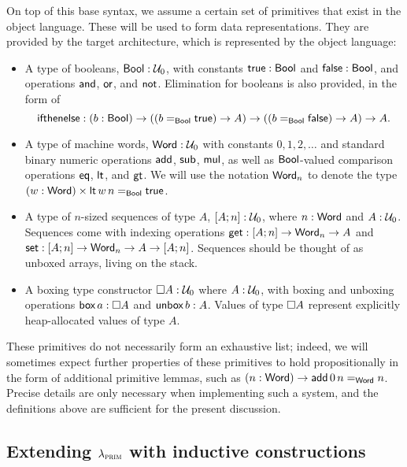 On top of this base syntax, we assume a certain set of primitives that exist in
the object language. These will be used to form data representations. They are
provided by the target architecture, which is represented by the object
language:
\begin{itemize}
  \item A type of booleans, $\inte{Bool} : \univ_0$, with constants $\inte{true} :
          \inte{Bool}$ and $\inte{false} : \inte{Bool}$, and operations $\inte{and}$,
        $\inte{or}$, and $\inte{not}$. Elimination for booleans is also provided, in
        the form of \[\inte{ifthenelse} : (b : \inte{Bool}) \to ((\Id{\inte{Bool}}{b}{\inte{true}}) \to A)
          \to ((\Id{\inte{Bool}}{b}{\inte{false}}) \to A) \to A.\]
  \item A type of machine words, $\inte{Word} : \univ_0$ with constants $0, 1, 2,
          \ldots$ and standard binary numeric operations $\inte{add}$, $\inte{sub}$,
        $\inte{mul}$, as well as $\inte{Bool}$-valued comparison operations
        $\inte{eq}$, $\inte{lt}$, and $\inte{gt}$. We will use the notation
        $\inte{Word}_n$ to denote the type $(w : \inte{Word}) \times
          \Id{\inte{Bool}}{\inte{lt} \, w \, n}{\inte{true}}$.
  \item A type of $n$-sized sequences of type $A$, $\seq{A}{n} : \univ_0$, where $n :
          \inte{Word}$ and $A : \univ_0$. Sequences come with indexing operations
        $\inte{get} : \seq{A}{n} \to \inte{Word}_n \to A$ and $\inte{set} : \seq{A}{n}
          \to \inte{Word}_n \to A \to \seq{A}{n}$. Sequences should be thought of as
        unboxed arrays, living on the stack.
  \item A boxing type constructor $\boxx A : \univ_0$ where $A : \univ_0$, with boxing
        and unboxing operations $\inbox a : \boxx A$ and $\unbox b : A$. Values of type
        $\boxx A$ represent explicitly heap-allocated values of type $A$.
\end{itemize}
These primitives do not necessarily form an exhaustive list; indeed, we will
sometimes expect further properties of these primitives to hold propositionally
in the form of additional primitive lemmas, such as
$(n : \inte{Word}) \to \Id{\inte{Word}}{\inte{add}\,0\,n}{n}$. Precise details are only necessary when
implementing such a system, and the definitions above are sufficient for the
present discussion.

\subsection{Extending $\lambdaprim$ with inductive constructions}

